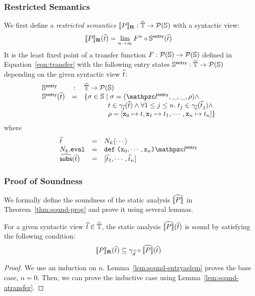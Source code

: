 \documentclass[10pt,conference]{IEEEtran}
\begin{document}
\subsubsection{Restricted Semantics} We first define a \textit{restricted semantics}
$\llbracket{P}\rrbracket_\textbf{R}: \widehat{\mathbb{T}} \rightarrow \mathcal{P}(\mathbb{S})$ with a syntactic view:
\[
  \llbracket{P}\rrbracket_\textbf{R}(\widehat{t}) = \lim_{n \rightarrow \infty}F^n \circ
  \mathbb{S}^{\textsf{entry}}(\widehat{t})
\]
It is the least fixed point of a transfer function $F: \mathcal{P}(\mathbb{S})
\rightarrow \mathcal{P}(\mathbb{S})$ defined in Equation~\ref{eqn:transfer} with the
following entry states $\mathbb{S}^{\textsf{entry}}: \widehat{\mathbb{T}} \rightarrow \mathcal{P}(\mathbb{S})$
depending on the given syntactic view $\widehat{t}$:
\[
  \begin{array}{lcl}
    \entrystset &:& \atreeset \rightarrow \powerset{\stset}\\

    \entrystset(\atree) &=& \{ \st \in \stset \mid
      \st = (\entrylab, \_, \_, \env) \wedge\\&&

      \phantom{\{ \st \in \stset \mid}
        \tree \in \atreegamma(\atree) \wedge \forall 1 \leq j \leq n. \;
      \tree_j \in \atreegamma(\atree_j) \wedge\\&&

      \phantom{\{ \st \in \stset \mid}
        \env = [\varx_0 \mapsto \tree, \varx_1 \mapsto \tree_1, \cdots,
        \varx_n \mapsto \tree_n]
      \}\\
    \end{array}
  \]
where
\[
  \begin{array}{lcl}
    \atree &=& \nt_k \langle \cdots \rangle\\
    \nt_k.\eval &=& \kwdef \; \kwrl \varx_0, \cdots, \varx_n \kwrr \entrylab\\
    \agetsubs(\atree) &=& [\atree_1, \cdots, \atree_n]\\
  \end{array}
\]


\subsubsection{Proof of Soundness} We formally define the soundness of the static
analysis $\widehat{\llbracket{P}\rrbracket}$ in Theorem~\ref{thm:sound-prog} and prove it using
several lemmas.

\begin{theorem}\label{thm:sound-prog}
  For a given syntactic view $\widehat{t} \in \widehat{\mathbb{T}}$, the static analysis
  $\widehat{\llbracket{P}\rrbracket}(\widehat{t})$ is sound by satisfying the following condition:
  \[
    \llbracket{P}\rrbracket_\textbf{R}(\widehat{t}) \subseteq \gamma_{\widehat{d}} \circ \widehat{\llbracket{P}\rrbracket}(\widehat{t})
  \]
\end{theorem}
\begin{proof}
  We use an induction on $n$.  Lemma~\ref{lem:sound-entryaelem} proves the base
  case, $n=0$. Then, we can prove the inductive case using
  Lemma~\ref{lem:sound-atransfer}.
\end{proof}
\end{document}
